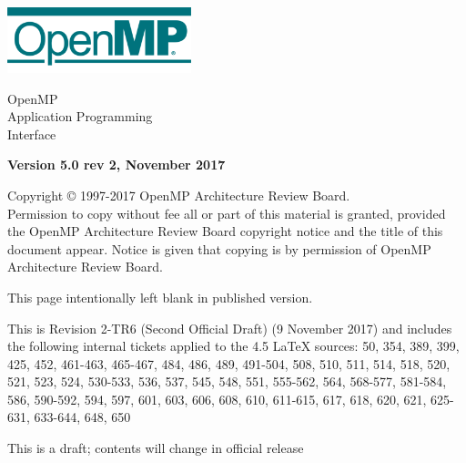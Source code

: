 
  \begin{titlepage}
    \begin{flushleft}
     \hspace{-6em} \includegraphics[width=0.4\textwidth]{openmp-logo.png}
    \end{flushleft}

    \begin{adjustwidth}{-0.75in}{0in}
    \begin{center}
      \Huge
      \textsf{OpenMP\\Application Programming\\Interface}

      \vspace{0.5in}\textsf{    }\vspace{-0.7in}
      \normalsize

      \vspace{1.0in}

      \textbf{Version 5.0 rev 2, November 2017}
    \end{center}
    \end{adjustwidth}

    \vspace{3.0in}

\begin{adjustwidth}{0pt}{1em}\setlength{\parskip}{0.25\baselineskip}%
Copyright © 1997-2017 OpenMP Architecture Review Board.\\
Permission to copy without fee all or part of this material is granted,
provided the OpenMP Architecture Review Board copyright notice and
the title of this document appear. Notice is given that copying is by
permission of OpenMP Architecture Review Board.\end{adjustwidth}

  \end{titlepage}


\clearpage
\thispagestyle{empty}
\phantom{a}
This page intentionally left blank in published version.

This is Revision 2-TR6 (Second Official Draft) (9 November 2017) and 
includes the following internal tickets applied to the 4.5 LaTeX sources: 
50, 354, 389, 399, 425, 452, 461-463, 465-467, 484, 486, 489, 491-504, 
508, 510, 511, 514, 518, 520, 521, 523, 524, 530-533, 536, 537, 545, 548, 
551, 555-562, 564, 568-577, 581-584, 586, 590-592, 594, 597, 601, 603, 606, 
608, 610, 611-615, 617, 618, 620, 621, 625-631, 633-644, 648, 650

This is a draft; contents will change in official release

\vfill

